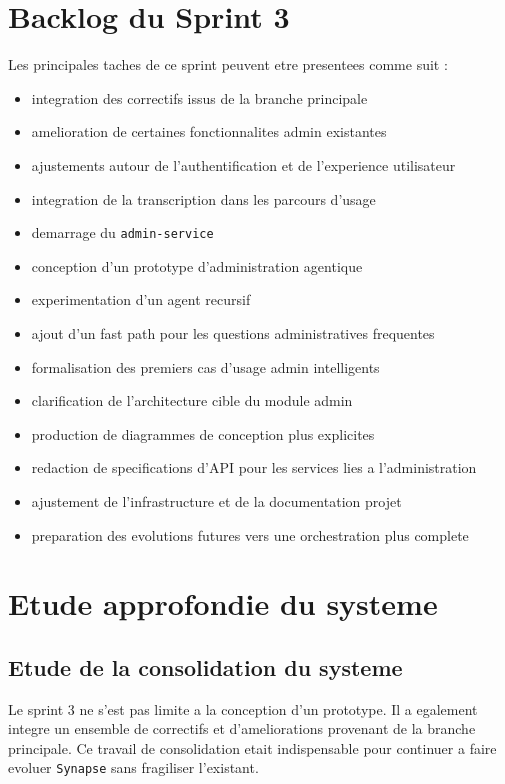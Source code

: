 \section{Backlog du Sprint 3}

Les principales taches de ce sprint peuvent etre presentees comme suit :

\begin{itemize}
\item integration des correctifs issus de la branche principale
\item amelioration de certaines fonctionnalites admin existantes
\item ajustements autour de l'authentification et de l'experience utilisateur
\item integration de la transcription dans les parcours d'usage
\item demarrage du \texttt{admin-service}
\item conception d'un prototype d'administration agentique
\item experimentation d'un agent recursif
\item ajout d'un fast path pour les questions administratives frequentes
\item formalisation des premiers cas d'usage admin intelligents
\item clarification de l'architecture cible du module admin
\item production de diagrammes de conception plus explicites
\item redaction de specifications d'API pour les services lies a l'administration
\item ajustement de l'infrastructure et de la documentation projet
\item preparation des evolutions futures vers une orchestration plus complete
\end{itemize}

\section{Etude approfondie du systeme}

\subsection{Etude de la consolidation du systeme}

Le sprint 3 ne s'est pas limite a la conception d'un prototype. Il a egalement integre un ensemble de correctifs et d'ameliorations provenant de la branche principale. Ce travail de consolidation etait indispensable pour continuer a faire evoluer \texttt{Synapse} sans fragiliser l'existant.

